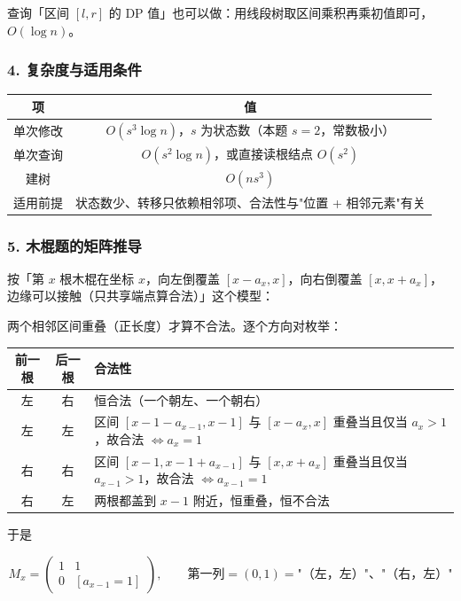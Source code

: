 查询「区间 $[l,r]$ 的 DP 值」也可以做：用线段树取区间乘积再乘初值即可，$O(\log n)$。

\subsubsection*{4. 复杂度与适用条件}

\begin{center}
\begin{tabular}{|c|c|}
\hline
\textbf{项} & \textbf{值} \\
\hline
单次修改 & $O(s^3\log n)$，$s$ 为状态数（本题 $s=2$，常数极小）\\
\hline
单次查询 & $O(s^2\log n)$，或直接读根结点 $O(s^2)$ \\
\hline
建树 & $O(ns^3)$ \\
\hline
适用前提 & 状态数少、转移只依赖相邻项、合法性与"位置 + 相邻元素"有关 \\
\hline
\end{tabular}
\end{center}

\subsubsection*{5. 木棍题的矩阵推导}

按「第 $x$ 根木棍在坐标 $x$，向左倒覆盖 $[x-a_x,x]$，向右倒覆盖 $[x,x+a_x]$，边缘可以接触（只共享端点算合法）」这个模型：

两个相邻区间重叠（正长度）才算不合法。逐个方向对枚举：

\begin{center}
\begin{tabular}{|c|c|p{8.2cm}|}
\hline
\textbf{前一根} & \textbf{后一根} & \textbf{合法性} \\
\hline
左 & 右 & 恒合法（一个朝左、一个朝右）\\
\hline
左 & 左 & 区间 $[x-1-a_{x-1},x-1]$ 与 $[x-a_x,x]$ 重叠当且仅当 $a_x>1$，故合法 $\iff a_x=1$ \\
\hline
右 & 右 & 区间 $[x-1,x-1+a_{x-1}]$ 与 $[x,x+a_x]$ 重叠当且仅当 $a_{x-1}>1$，故合法 $\iff a_{x-1}=1$ \\
\hline
右 & 左 & 两根都盖到 $x-1$ 附近，恒重叠，恒不合法 \\
\hline
\end{tabular}
\end{center}

于是

$$M_x=\begin{pmatrix}1&1\\0&[a_{x-1}=1]\end{pmatrix},\qquad
\text{第一列} = (0,1)=\text{"（左，左）"、"（右，左）"}$$

